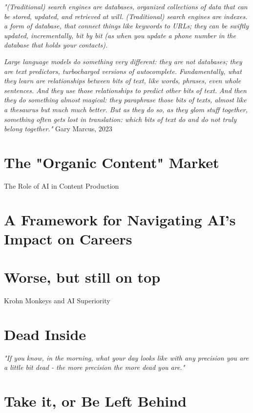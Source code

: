\textit{"(Traditional) search engines are databases, organized collections of data that can be stored, updated, and retrieved at will. (Traditional) search engines are indexes. a form of database, that connect things like keywords to URLs; they can be swiftly updated, incrementally, bit by bit (as when you update a phone number in the database that holds your contacts).}

\textit{Large language models do something very different: they are not databases; they are text predictors, turbocharged versions of autocomplete. Fundamentally, what they learn are relationships between bits of text, like words, phrases, even whole sentences. And they use those relationships to predict other bits of text. And then they do something almost magical: they paraphrase those bits of texts, almost like a thesaurus but much much better. But as they do so, as they glom stuff together, something often gets lost in translation: which bits of text do and do not truly belong together."} Gary Marcus, 2023 \cite{marcus2023}

\section{The "Organic Content" Market}

The Role of AI in Content Production

\section{A Framework for Navigating AI's Impact on Careers}

\section{Worse, but still on top}

Krohn Monkeys and AI Superiority \cite{KrohnTED}

\section{Dead Inside}

\textit{"If you know, in the morning, what your day looks like with any precision you are a little bit dead - the more precision the more dead you are."}\cite{procrustes}

\section{Take it, or Be Left Behind}

